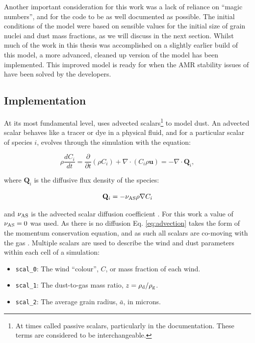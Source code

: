 Another important consideration for this work was a lack of reliance on ``magic numbers'', and for the code to be as well documented as possible.
The initial conditions of the model were based on sensible values for the initial size of grain nuclei and dust mass fractions, as we will discuss in the next section.
Whilst much of the work in this thesis was accomplished on a slightly earlier build of this model, a more advanced, cleaned up version of the model has been implemented.
This improved model is ready for when the AMR stability issues of \athena{} have been solved by the developers.

\subsection{Implementation}



At its most fundamental level, \bidmas{} uses advected scalars\footnote{At times called passive scalars, particularly in the \athena{} documentation. These terms are considered to be interchangeable.} to model dust.
An advected scalar behaves like a tracer or dye in a physical fluid, and for a particular scalar of species $i$, evolves through the simulation with the equation:

\begin{equation}
  \label{eq:advection}
  \rho \frac{dC_i}{dt} = \frac{\partial}{\partial t} \left( \rho C_i \right) + \nabla \cdot \left( C_i \rho \mathbf{u} \right) = -\nabla \cdot \mathbf{Q}_i ,  
\end{equation}

\noindent
where $\mathbf{Q}_i$ is the diffusive flux density of the species:

\begin{equation}
  \mathbf{Q}_i = - \nu_\text{AS} \rho \nabla C_i
\end{equation}

\noindent
and $\nu_\text{AS}$ is the advected scalar diffusion coefficient \parencite{stoneAthenaAdaptiveMesh2020}.
For this work a value of $\nu_\text{AS} = 0$ was used.
As there is no diffusion Eq. \ref{eq:advection} takes the form of the momentum conservation equation, and as such all scalars are co-moving with the gas \parencite[Ch.~10]{toro_riemann_2013}.
Multiple scalars are used to describe the wind and dust parameters within each cell of a simulation:

\begin{itemize}
  \item \texttt{scal\_0}: The wind ``colour'', $C$, or mass fraction of each wind. 
  \item \texttt{scal\_1}: The dust-to-gas mass ratio, $z = \rho_\text{d}/\rho_\text{g}$.
  \item \texttt{scal\_2}: The average grain radius, $\bar{a}$, in microns.
\end{itemize}

